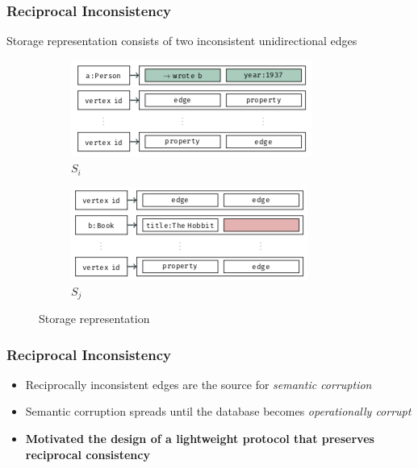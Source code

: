\begin{frame}
  \frametitle{Reciprocal Inconsistency}
Storage representation consists of two inconsistent unidirectional edges

\begin{figure}
\centering
\begin{subfigure}{.5\textwidth}
  \centering
  \includegraphics[width=.9\linewidth]{./images/si}
  \caption{$S_i$}
  \label{fig:sub1}
\end{subfigure}%
\begin{subfigure}{.5\textwidth}
  \centering
  \includegraphics[width=.9\linewidth]{./images/sj}
  \caption{$S_j$}
  \label{fig:sub2}
\end{subfigure}
\caption{Storage representation}
\label{fig:test}
\end{figure}
\end{frame}

\begin{frame}
  \frametitle{Reciprocal Inconsistency}
  \begin{itemize}
  \item Reciprocally inconsistent edges are the source for \emph{semantic corruption}
  \item Semantic corruption spreads until the database becomes \emph{operationally corrupt}
  \item \textbf{Motivated the design of a lightweight protocol that preserves reciprocal consistency}
  \end{itemize}
\end{frame}